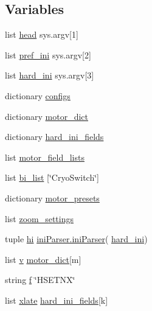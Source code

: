 \subsection*{Variables}
\begin{DoxyCompactItemize}
\item 
list \hyperlink{namespacemk__pgpmac__redis_a760ff4955cbf5beef4ae36a28c30b01a}{head} sys.\-argv\mbox{[}1\mbox{]}
\item 
list \hyperlink{namespacemk__pgpmac__redis_a38c785af5201403976e1267c47ea5096}{pref\-\_\-ini} sys.\-argv\mbox{[}2\mbox{]}
\item 
list \hyperlink{namespacemk__pgpmac__redis_a5864d9c27cbe61534756880cbfebe4f1}{hard\-\_\-ini} sys.\-argv\mbox{[}3\mbox{]}
\item 
dictionary \hyperlink{namespacemk__pgpmac__redis_a9dc9b1bd47efd207604312cd60637526}{configs}
\item 
dictionary \hyperlink{namespacemk__pgpmac__redis_ad8583d4fe88c4c98af73d2858c51c660}{motor\-\_\-dict}
\item 
dictionary \hyperlink{namespacemk__pgpmac__redis_a8257226983aee079ec66f5cc67e194ec}{hard\-\_\-ini\-\_\-fields}
\item 
list \hyperlink{namespacemk__pgpmac__redis_a7228dc1b6ecec376538db1efe8c05ffb}{motor\-\_\-field\-\_\-lists}
\item 
list \hyperlink{namespacemk__pgpmac__redis_a961bfabfbdcbf5b749f6e6ecdc733619}{bi\-\_\-list} \mbox{[}\char`\"{}Cryo\-Switch\char`\"{}\mbox{]}
\item 
dictionary \hyperlink{namespacemk__pgpmac__redis_a2a04d8d0b7270384d1fac674c29e774a}{motor\-\_\-presets}
\item 
list \hyperlink{namespacemk__pgpmac__redis_ad91bac9be746f99e1cf1f8e28ff348be}{zoom\-\_\-settings}
\item 
tuple \hyperlink{namespacemk__pgpmac__redis_af0e472a4df25fc5c1660ef07226689a8}{hi} \hyperlink{classiniParser_1_1iniParser}{ini\-Parser.\-ini\-Parser}( \hyperlink{namespacemk__pgpmac__redis_a5864d9c27cbe61534756880cbfebe4f1}{hard\-\_\-ini})
\item 
list \hyperlink{namespacemk__pgpmac__redis_ac732d49b0afca9a9951e3a252bae42fc}{v} \hyperlink{namespacemk__pgpmac__redis_ad8583d4fe88c4c98af73d2858c51c660}{motor\-\_\-dict}\mbox{[}m\mbox{]}
\item 
string \hyperlink{namespacemk__pgpmac__redis_a057fe7457503e0de97edcf855591ed58}{f} \char`\"{}H\-S\-E\-T\-N\-X\char`\"{}
\item 
list \hyperlink{namespacemk__pgpmac__redis_afba647feb8fc4d0a364c3dca29af3a22}{xlate} \hyperlink{namespacemk__pgpmac__redis_a8257226983aee079ec66f5cc67e194ec}{hard\-\_\-ini\-\_\-fields}\mbox{[}k\mbox{]}

\end{DoxyCompactItemize}
